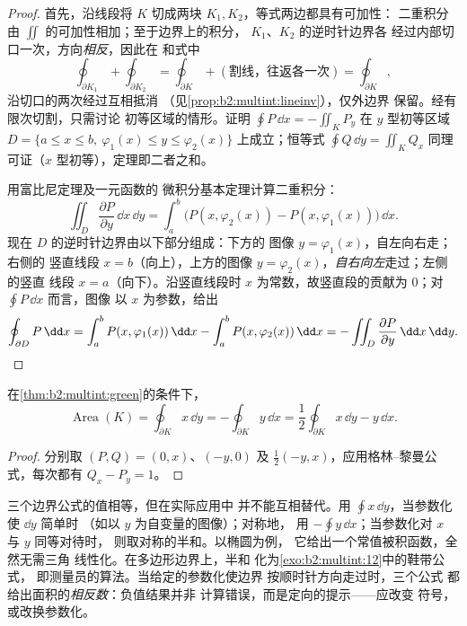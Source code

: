 \begin{proof}
首先，沿线段将 $K$
切成两块 $K_1, K_2$，等式两边都具有可加性：
二重积分由 $\iint$ 的可加性相加；至于边界上的积分，
$K_1$、$K_2$ 的逆时针边界各
经过内部切口一次，方向\emph{相反}，因此在
和式中
\[
\oint_{\partial K_1} + \oint_{\partial K_2}
= \oint_{\partial K} + (\text{割线，往返各一次})
= \oint_{\partial K},
\]
沿切口的两次经过互相抵消
（见\cref{prop:b2:multint:lineinv}），仅外边界
保留。经有限次切割，只需讨论
初等区域的情形。证明 $\oint P\,\dd x = -\iint_K P_y$ 在
$y$ 型初等区域 $D = \{a \leq x \leq b,\ \varphi_1(x) \leq y
\leq \varphi_2(x)\}$ 上成立；恒等式 $\oint Q\,\dd y = \iint_K Q_x$
同理可证（$x$ 型初等），定理即二者之和。

用富比尼定理及一元函数的
微积分基本定理计算二重积分：
\[
\iint_D \frac{\partial P}{\partial y}\,\dd x\,\dd y
= \int_a^b \bigl(P(x, \varphi_2(x)) - P(x, \varphi_1(x))\bigr)
\,\dd x .
\]
现在 $D$ 的逆时针边界由以下部分组成：下方的
图像 $y = \varphi_1(x)$，自左向右走；右侧的
竖直线段 $x = b$（向上），上方的图像 $y =
\varphi_2(x)$，\emph{自右向左}走过；左侧的竖直
线段 $x = a$（向下）。沿竖直线段时 $x$
为常数，故竖直段的贡献为 $0$；对 $\oint P\,\dd x$ 而言，图像
以 $x$ 为参数，给出
\[
\oint_{\partial D} P\,\dd x
= \int_a^b P(x, \varphi_1(x))\,\dd x
- \int_a^b P(x, \varphi_2(x))\,\dd x
= -\iint_D \frac{\partial P}{\partial y}\,\dd x\,\dd y .
\qedhere
\]
\end{proof}

\begin{corollary}[由边界求面积]\label{cor:b2:multint:area}
在\cref{thm:b2:multint:green}的条件下，
\[
\operatorname{Area}(K)
= \oint_{\partial K} x\,\dd y
= -\oint_{\partial K} y\,\dd x
= \frac12\oint_{\partial K} x\,\dd y - y\,\dd x .
\]
\end{corollary}

\begin{proof}
分别取 $(P, Q) = (0, x)$、$(-y, 0)$ 及
$\frac12(-y, x)$，应用格林–黎曼公式，每次都有 $Q_x - P_y = 1$。
\end{proof}

\begin{remark}[三种面积公式的选取]
三个边界公式的值相等，但在实际应用中
并不能互相替代。用 $\oint x\,\dd y$，当参数化使 $\dd y$ 简单时
（如以 $y$ 为自变量的图像）；对称地，
用 $-\oint y\,\dd x$；当参数化对 $x$ 与 $y$ 同等对待时，
则取对称的半和。以椭圆为例，
它给出一个常值被积函数，全然无需三角
线性化。在多边形边界上，半和
化为\cref{exo:b2:multint:12}中的鞋带公式，
即测量员的算法。当给定的参数化使边界
按顺时针方向走过时，三个公式
都给出面积的\emph{相反数}：负值结果并非
计算错误，而是定向的提示——应改变
符号，或改换参数化。
\end{remark}

